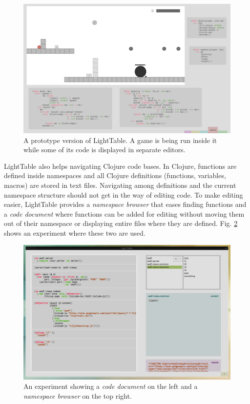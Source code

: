 \documentclass{./llncs2e/llncs}
\begin{document}
	\begin{figure}
	  \centering
	  \includegraphics[width=1.0\textwidth]{img/lt_game_example__inv}
	    \caption{A prototype version of LightTable. A game is being run inside it while some of its code is displayed in separate editors.}
	  \label{fig:lt:draft:table}
	\end{figure} 

	LightTable also helps navigating Clojure code bases.
	In Clojure, functions are defined inside namespaces and all Clojure definitions (functions, variables, macros) are stored in text files. 
	Navigating among definitions and the current namespace structure should not get in the way of editing code. 
	To make editing easier, LightTable provides a \emph{namespace browser} that eases finding functions and a \emph{code document} where functions can be added for editing without moving them out of their namespace or displaying entire files where they are defined. 
	Fig. \ref{fig:lt:clojure:table} shows an experiment where these two are used.

	\begin{figure}
	  \centering
	  \includegraphics[width=1.0\textwidth]{img/lt_clojure_table__inv}
	    \caption{An experiment showing a \emph{code document} on the left and a \emph{namespace browser} on the top right.}
	  \label{fig:lt:clojure:table}
	\end{figure} 
\end{document}
